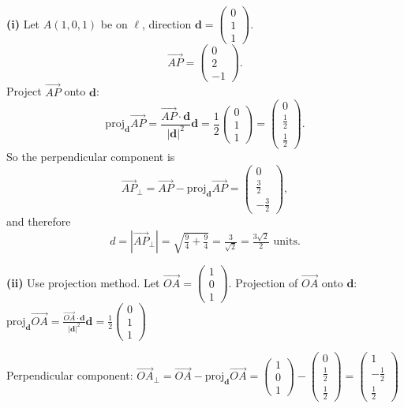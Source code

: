 \begin{solution}
\textbf{(i)} Let $A(1, 0, 1)$ be on $\ell$, direction $\mathbf{d} = \begin{pmatrix} 0 \\ 1 \\ 1 \end{pmatrix}$.
\[
\vec{AP} = \begin{pmatrix} 0 \\ 2 \\ -1 \end{pmatrix}.
\]
Project $\vec{AP}$ onto $\mathbf{d}$:
\[
\text{proj}_{\mathbf{d}}\vec{AP}
= \frac{\vec{AP} \cdot \mathbf{d}}{|\mathbf{d}|^2}\mathbf{d}
= \frac{1}{2}\begin{pmatrix} 0 \\ 1 \\ 1 \end{pmatrix}
= \begin{pmatrix} 0 \\ \tfrac12 \\ \tfrac12 \end{pmatrix}.
\]
So the perpendicular component is
\[
\vec{AP}_{\perp}
= \vec{AP} - \text{proj}_{\mathbf{d}}\vec{AP}
= \begin{pmatrix} 0 \\ \tfrac32 \\ -\tfrac32 \end{pmatrix},
\]
and therefore
\[
d = |\vec{AP}_{\perp}| = \sqrt{\tfrac{9}{4} + \tfrac{9}{4}} = \tfrac{3}{\sqrt{2}} = \tfrac{3\sqrt{2}}{2}\text{ units}.
\]
\vspace{-2mm}

\textbf{(ii)} Use projection method. Let $\vec{OA} = \begin{pmatrix} 1 \\ 0 \\ 1 \end{pmatrix}$.
Projection of $\vec{OA}$ onto $\mathbf{d}$: $\text{proj}_{\mathbf{d}}\vec{OA} = \tfrac{\vec{OA} \cdot \mathbf{d}}{|\mathbf{d}|^2}\mathbf{d} = \tfrac{1}{2}\begin{pmatrix} 0 \\ 1 \\ 1 \end{pmatrix}$
\vspace{-2mm}

Perpendicular component: $\vec{OA}_{\perp} = \vec{OA} - \text{proj}_{\mathbf{d}}\vec{OA} = \begin{pmatrix} 1 \\ 0 \\ 1 \end{pmatrix} - \begin{pmatrix} 0 \\ \tfrac{1}{2} \\ \tfrac{1}{2} \end{pmatrix} = \begin{pmatrix} 1 \\ -\tfrac{1}{2} \\ \tfrac{1}{2} \end{pmatrix}$
\vspace{-2mm}


\end{solution}
